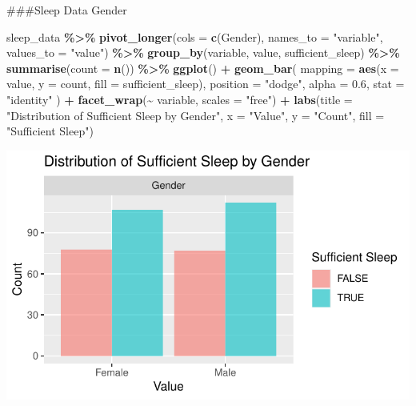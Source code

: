 \documentclass[
  11pt,
]{article}
\newenvironment{Shaded}{\begin{snugshade}}{\end{snugshade}}
\newcommand{\AttributeTok}[1]{\textcolor[rgb]{0.13,0.29,0.53}{#1}}
\newcommand{\FloatTok}[1]{\textcolor[rgb]{0.00,0.00,0.81}{#1}}
\newcommand{\FunctionTok}[1]{\textcolor[rgb]{0.13,0.29,0.53}{\textbf{#1}}}
\newcommand{\NormalTok}[1]{#1}
\newcommand{\SpecialCharTok}[1]{\textcolor[rgb]{0.81,0.36,0.00}{\textbf{#1}}}
\newcommand{\StringTok}[1]{\textcolor[rgb]{0.31,0.60,0.02}{#1}}
\begin{document}
\#\#\#Sleep Data Gender

\begin{Shaded}
\begin{Highlighting}[]
\NormalTok{sleep\_data }\SpecialCharTok{\%\textgreater{}\%}
  \FunctionTok{pivot\_longer}\NormalTok{(}\AttributeTok{cols =} \FunctionTok{c}\NormalTok{(Gender), }\AttributeTok{names\_to =} \StringTok{"variable"}\NormalTok{, }\AttributeTok{values\_to =} \StringTok{"value"}\NormalTok{) }\SpecialCharTok{\%\textgreater{}\%}
  \FunctionTok{group\_by}\NormalTok{(variable, value, sufficient\_sleep) }\SpecialCharTok{\%\textgreater{}\%}
  \FunctionTok{summarise}\NormalTok{(}\AttributeTok{count =} \FunctionTok{n}\NormalTok{()) }\SpecialCharTok{\%\textgreater{}\%}
  \FunctionTok{ggplot}\NormalTok{() }\SpecialCharTok{+}
  \FunctionTok{geom\_bar}\NormalTok{(}
    \AttributeTok{mapping =} \FunctionTok{aes}\NormalTok{(}\AttributeTok{x =}\NormalTok{ value, }\AttributeTok{y =}\NormalTok{ count, }\AttributeTok{fill =}\NormalTok{ sufficient\_sleep),}
    \AttributeTok{position =} \StringTok{"dodge"}\NormalTok{,  }
    \AttributeTok{alpha =} \FloatTok{0.6}\NormalTok{,}
    \AttributeTok{stat =} \StringTok{"identity"}
\NormalTok{  ) }\SpecialCharTok{+}
  \FunctionTok{facet\_wrap}\NormalTok{(}\SpecialCharTok{\textasciitilde{}}\NormalTok{ variable, }\AttributeTok{scales =} \StringTok{"free"}\NormalTok{) }\SpecialCharTok{+}
  \FunctionTok{labs}\NormalTok{(}\AttributeTok{title =} \StringTok{"Distribution of Sufficient Sleep by Gender"}\NormalTok{,}
       \AttributeTok{x =} \StringTok{"Value"}\NormalTok{, }
       \AttributeTok{y =} \StringTok{"Count"}\NormalTok{, }
       \AttributeTok{fill =} \StringTok{"Sufficient Sleep"}\NormalTok{)}
\end{Highlighting}
\end{Shaded}

\begin{center}\includegraphics[width=0.7\linewidth]{SleepHelath_files/figure-latex/unnamed-chunk-43-1} \end{center}
\end{document}
